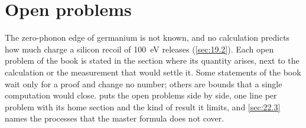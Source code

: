 \chapter{Open problems}\label{chap:22}
The zero-phonon edge of germanium is not known, and no calculation predicts how much charge a silicon recoil of \SI{100}{eV} releases (\cref{sec:19.2}). Each open problem of the book is stated in the section where its quantity arises, next to the calculation or the measurement that would settle it. Some statements of the book wait only for a proof and change no number; others are bounds that a single computation would close.  puts the open problems side by side, one line per problem with its home section and the kind of result it limits, and \cref{sec:22.3} names the processes that the master formula does not cover.




\printbibliography[heading=subbibliography]
